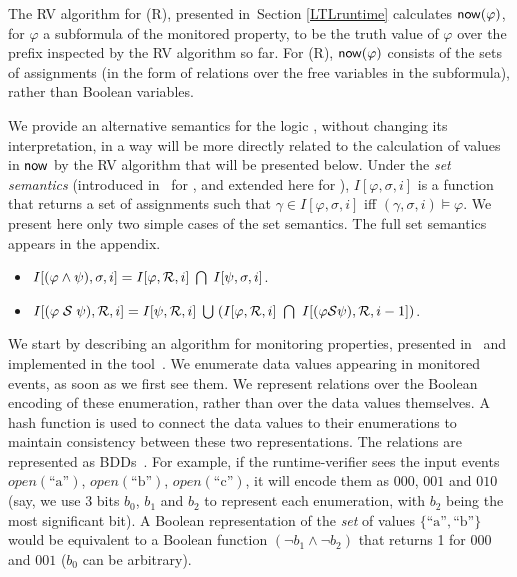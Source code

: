 \fi

\vspace{1.4ex} 
The RV algorithm for
(R)\PLTL{}, presented in~Section \ref{LTLruntime}
calculates
$\mathsf{now} ( \varphi )$, for $\varphi$ a
subformula of the monitored property, to be the
truth value of $\varphi$ over the
prefix inspected by the RV algorithm so far. For (R)\PFLTL{},
$\mathsf{now} (\varphi)$ consists of the
sets of assignments (in the form of relations
over the free variables in the subformula),
rather than Boolean variables.


We provide an alternative semantics for 
the logic \EPFLTL{}, without
changing its interpretation, in a
way will be more directly related to the calculation of values
in $\mathsf{now}$ by the
RV algorithm that will be presented below. 
Under the  {\em set semantics}
(introduced in~\cite{HPU} for \PFLTL{}, and extended here for \EPFLTL{}),
$I [ \varphi , \sigma, i ]$ is a function that returns
a set of assignments such that $\gamma \in I [ \varphi , \sigma, i ]$ 
iff $( \gamma , \sigma , i ) \models \varphi$.
We present here only two simple cases of the set semantics. The full set semantics appears in the appendix. 
\begin{itemize}
\item $I [ ( \varphi \wedge \psi ) , \sigma , i ] = 
I [ \varphi , {\cal R} , i ] \;  \bigcap \; I [ \psi , \sigma , i ]$.
\item $I [ ( \varphi \; \since \; \psi ) , {\cal R} , i ] = 
I [ \psi , {\cal R}, i ] \; \bigcup \;
( I [ \varphi , {\cal R} , i ] \ \bigcap \ 
I [ (\varphi \since \psi ) , {\cal R} , i - 1 ] )$.
\end{itemize}



%
We start by describing an algorithm for monitoring 
\PFLTL{} properties, presented in~\cite{HPU} and implemented
in the tool~\dejavu. 
We enumerate data values appearing in
monitored events, as soon as we first see them. We
represent relations over the Boolean
encoding of these enumeration, rather than over the data values themselves. A hash function is used to connect the data values to their enumerations to maintain consistency
between these two representations.
The relations are
represented as BDDs~\cite{Bryant}. 
For example, if the runtime-verifier sees the input 
events 
$\mathit{open}(\text{``a''})$, 
$\mathit{open}(\text{``b''})$, 
$\mathit{open}(\text{``c''})$, 
it will encode them as
$000$, $001$ and $010$ (say, we use 3 bits $b_0$, $b_1$ and $b_2$
to represent each enumeration, with $b_2$ being the most significant bit).
%
A Boolean representation of the {\em set} of values 
$\{\text{``a''},\text{``b''}\} $ would be equivalent to a Boolean function $(\neg b_1 \wedge \neg b_2)$ that returns 1 for $000$ and $001$ ($b_0$ can be arbitrary).

